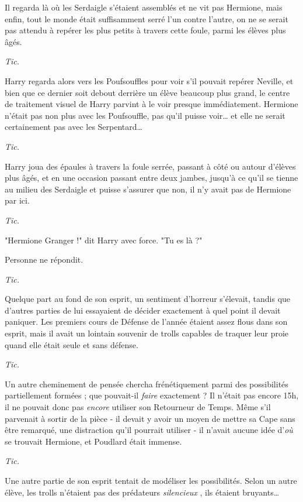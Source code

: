 Il regarda là où les Serdaigle s'étaient assemblés et ne vit pas Hermione, mais enfin, tout le monde était suffisamment serré l'un contre l'autre, on ne se serait pas attendu à repérer les plus petits à travers cette foule, parmi les élèves plus âgés.

\emph{Tic.} 

Harry regarda alors vers les Poufsouffles pour voir s'il pouvait repérer Neville, et bien que ce dernier soit debout derrière un élève beaucoup plus grand, le centre de traitement visuel de Harry parvint à le voir presque immédiatement. Hermione n'était pas non plus avec les Poufsouffle, pas qu'il puisse voir… et elle ne serait certainement pas avec les Serpentard…

\emph{Tic.} 

Harry joua des épaules à travers la foule serrée, passant à côté ou autour d'élèves plus âgés, et en une occasion passant entre deux jambes, jusqu'à ce qu'il se tienne au milieu des Serdaigle et puisse s'assurer que non, il n'y avait pas de Hermione par ici.

\emph{Tic.} 

"Hermione Granger !" dit Harry avec force. "Tu es là ?"

Personne ne répondit.

\emph{Tic.} 

Quelque part au fond de son esprit, un sentiment d'horreur s'élevait, tandis que d'autres parties de lui essayaient de décider exactement à quel point il devait paniquer. Les premiers cours de Défense de l'année étaient assez flous dans son esprit, mais il avait un lointain souvenir de trolls capables de traquer leur proie quand elle était seule et sans défense.

\emph{Tic.} 

Un autre cheminement de pensée chercha frénétiquement parmi des possibilités partiellement formées ; que pouvait-il \emph{faire}  exactement ? Il n'était pas encore 15h, il ne pouvait donc pas \emph{encore}  utiliser son Retourneur de Temps. Même s'il parvenait à sortir de la pièce - il devait y avoir un moyen de mettre sa Cape sans être remarqué, une distraction qu'il pourrait utiliser - il n'avait aucune idée d'\emph{où}  se trouvait Hermione, et Poudlard était immense.

\emph{Tic.} 

Une autre partie de son esprit tentait de modéliser les possibilités. Selon un autre élève, les trolls n'étaient pas des prédateurs \emph{silencieux} , ils étaient bruyants…

